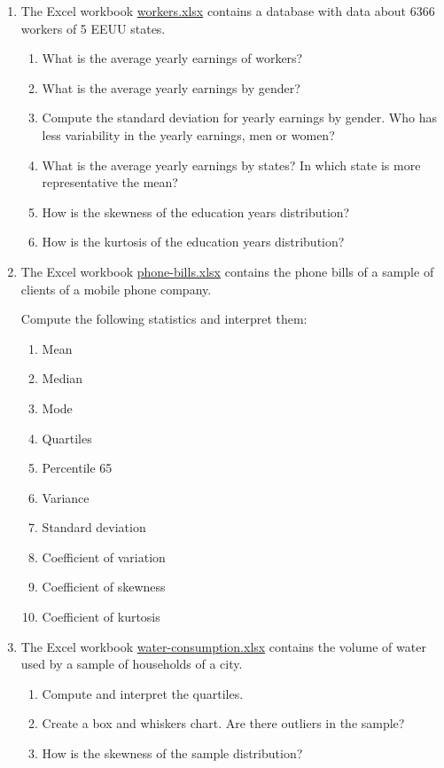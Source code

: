 \begin{enumerate}[leftmargin=*,resume]
\item The Excel workbook
\href{http://aprendeconalf.es/office/excel/exercises/databases/workers.xlsx}{\textsf{workers.xlsx}}
contains a database with data about 6366 workers of 5 EEUU states.
\begin{enumerate}
\item What is the average yearly earnings of workers?
\item What is the average yearly earnings by gender?
\item Compute the standard deviation for yearly earnings by gender.
Who has less variability in the yearly earnings, men or women?
\item What is the average yearly earnings by states?
In which state is more representative the mean?
\item How is the skewness of the education years distribution?
\item How is the kurtosis of the education years distribution?
\end{enumerate}


\item The Excel workbook
\href{http://aprendeconalf.es/office/excel/exercises/descriptive-statistics/phone-bills.xlsx}{\textsf{phone-bills.xlsx}}
contains the phone bills of a sample of clients of a mobile phone company. 

Compute the following statistics and interpret them:
\begin{enumerate}
\item Mean
\item Median
\item Mode
\item Quartiles
\item Percentile 65
\item Variance
\item Standard deviation
\item Coefficient of variation
\item Coefficient of skewness
\item Coefficient of kurtosis
\end{enumerate}

\item The Excel workbook \href{http://aprendeconalf.es/office/excel/exercises/descriptive-statistics/water-consumption.xlsx}{\textsf{water-consumption.xlsx}}
contains the volume of water used by a sample of households of a city. 

\begin{enumerate}
\item Compute and interpret the quartiles.
\item Create a box and whiskers chart. 
Are there outliers in the sample?
\item How is the skewness of the sample distribution?
\end{enumerate}


\end{enumerate}
